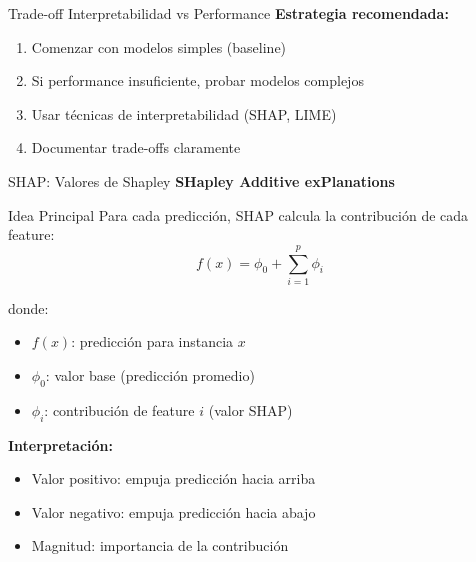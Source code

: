 \documentclass[aspectratio=169]{beamer}
\begin{document}
\begin{frame}{Trade-off Interpretabilidad vs Performance}
\textbf{Estrategia recomendada:}
\begin{enumerate}
\item Comenzar con modelos simples (baseline)
\item Si performance insuficiente, probar modelos complejos
\item Usar técnicas de interpretabilidad (SHAP, LIME)
\item Documentar trade-offs claramente
\end{enumerate}
\end{frame}

\begin{frame}{SHAP: Valores de Shapley}
\textbf{SHapley Additive exPlanations}

\vspace{0.3cm}

\begin{block}{Idea Principal}
Para cada predicción, SHAP calcula la contribución de cada feature:
$$f(x) = \phi_0 + \sum_{i=1}^{p} \phi_i$$

donde:
\begin{itemize}
\item $f(x)$: predicción para instancia $x$
\item $\phi_0$: valor base (predicción promedio)
\item $\phi_i$: contribución de feature $i$ (valor SHAP)
\end{itemize}
\end{block}

\vspace{0.3cm}

\textbf{Interpretación:}
\begin{itemize}
\item Valor positivo: empuja predicción hacia arriba
\item Valor negativo: empuja predicción hacia abajo
\item Magnitud: importancia de la contribución
\end{itemize}
\end{frame}
\end{document}
